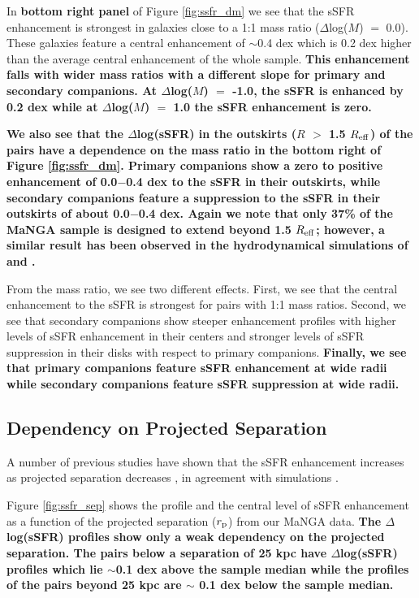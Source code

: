 \documentclass[iop,revtex4,twocolumn,apj,numberedappendix,appendixfloats]{emulateapj}
\newcommand{\reff}{$R_{\rm eff}$}
\begin{document}
In \textbf{bottom right panel} of Figure \ref{fig:ssfr_dm} we see that the sSFR enhancement is strongest in galaxies close to a 1:1 mass ratio ($\Delta$log($M$) $=$ 0.0). These galaxies feature a central enhancement of $\sim$0.4 dex which is 0.2 dex higher than the average central enhancement of the whole sample. \textbf{This enhancement falls with wider mass ratios with a different slope for primary and secondary companions. At $\Delta$log($M$) $=$ -1.0, the sSFR is enhanced by 0.2 dex while at $\Delta$log($M$) $=$ 1.0 the sSFR enhancement is zero.}

\textbf{We also see that the $\Delta$log(sSFR) in the outskirts ($R$ $>$ 1.5 \reff) of the pairs have a dependence on the mass ratio in the bottom right of Figure \ref{fig:ssfr_dm}. Primary companions show a zero to positive enhancement of 0.0$-$0.4 dex to the sSFR in their outskirts, while secondary companions feature a suppression to the sSFR in their outskirts of about 0.0$-$0.4 dex. Again we note that only 37\% of the MaNGA sample is designed to extend beyond 1.5 \reff; however, a similar result has been observed in the hydrodynamical simulations of \citet{Moreno:2015} and \citet{Moreno:2020}. }

From the mass ratio, we see two different effects. First, we see that the central enhancement to the sSFR is strongest for pairs with 1:1 mass ratios. Second, we see that secondary companions show steeper enhancement profiles with higher levels of sSFR enhancement in their centers and stronger levels of sSFR suppression in their disks with respect to primary companions. \textbf{Finally, we see that primary companions feature sSFR enhancement at wide radii while secondary companions feature sSFR suppression at wide radii.}

\subsection{Dependency on Projected Separation}\label{sec:sep}

A number of previous studies have shown that the sSFR enhancement increases as projected separation decreases \citep[e.g.,][]{Li:2008, Ellison:2008, Scudder:2012, Patton:2013}, in agreement with simulations \citep{Scudder:2012}. 

Figure \ref{fig:ssfr_sep} shows the profile and the central level of sSFR enhancement as a function of the projected separation ($r_{\rm p}$) from our MaNGA data. \textbf{The $\Delta$log(sSFR) profiles show only a weak dependency on the projected separation. The pairs below a separation of 25 kpc have $\Delta$log(sSFR) profiles which lie $\sim$0.1 dex above the sample median while the profiles of the pairs beyond 25 kpc are $\sim$ 0.1 dex below the sample median. }
\end{document}
